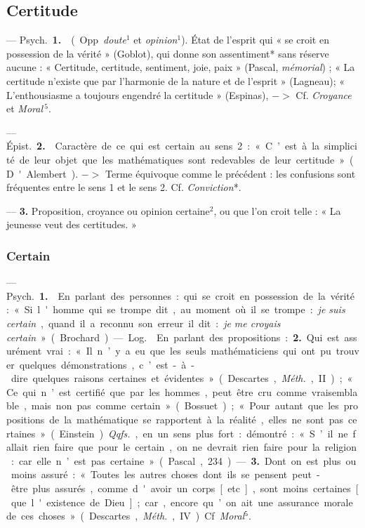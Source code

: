 \subsection{Certitude}
 —  \si{Psych.} {\bf 1.}  (Opp.
{\it doute}$^1$ et {\it opinion}$^1$). État de l’esprit
qui « se croit en possession de la
vérité » (Goblot), qui donne son
assentiment* sans réserve aucune :
« Certitude, certitude, sentiment,
joie, paix » (Pascal, {\it mémorial}) ; « La
certitude n'existe que par l’harmonie de la nature et de l'esprit »
(Lagneau); « L’enthousiasme a toujours engendré la certitude » (Espinas), $->$ Cf. {\it Croyance} et {\it Moral}$\,^5$.

— \si{Épist.} {\bf 2.}  Caractère de ce qui
est certain au sens 2 : « C’est à la
simplicité de leur objet que les mathématiques sont redevables de leur
certitude » (D'Alembert). $->$ Terme
équivoque comme le précédent : les
confusions sont fréquentes entre le
sens 1 et le sens 2. Cf. {\it Conviction}*.

—  {\bf 3.} Proposition, croyance
ou opinion certaine$^2$, ou que l’on
croit telle : « La jeunesse veut des
certitudes. »

\subsubsection{Certain}
 — \si{Psych.} {\bf 1.}  En parlant des
personnes : qui se croit en possession de la vérité : « Si l'homme qui se
trompe dit, au moment où il se
trompe : {\it je suis certain}, quand il a
reconnu son erreur il dit : {\it je me
croyais certain} » (Brochard).

— \si{Log.}  En parlant des propositions : {\bf 2.} Qui est assurément vrai:
« Il n’y a eu que les seuls mathématiciens qui ont pu trouver quelques
démonstrations, c’est-à-dire quelques
raisons certaines et évidentes »
(Descartes, {\it Méth.}, II); « Ce qui n’est
certifié que par les hommes, peut
être cru comme vraisemblable, mais
non pas comme certain » (Bossuet);
« Pour autant que les propositions
de la mathématique se rapportent
à la réalité, elles ne sont pas certaines » (Einstein). {\it Qqfs.}, en un sens
plus fort : démontré : « S’il ne fallait
rien faire que pour le certain, on ne
devrait rien faire pour la religion:
car elle n’est pas certaine » (Pascal,
234). — {\bf 3.} Dont on est plus ou
moins assuré : « Toutes les autres
choses dont ils se pensent peut-être
plus assurés, comme d'avoir un
corps [etc.], sont moins certaines
[que l'existence de Dieu]; car, encore
qu’on ait une assurance morale de
ces choses... » (Descartes, {\it Méth.}, IV).
Cf. {\it Moral}$^5$.

